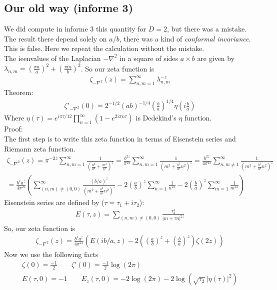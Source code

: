 \documentclass[12pt]{article}
\begin{document}
\subsection{Our old way (informe 3)}
We did compute in informe 3 this quantity for $D=2$, but there was a mistake. The result there depend solely on $a/b$, there was a kind of \textit{conformal invariance}. This is false. Here we repeat the calculation without the mistake.\\
The ieenvalues of the Laplacian $-\nabla^2$ in a square of sides $a\times b$ are given by $\lambda_{n,m}=\left(\frac{\pi n}{a}\right)^2+\left(\frac{\pi m}{b}\right)^2$. So our zeta function is
\begin{gather}
\zeta_{-\nabla^2}(z)=\sum_{n,m=1}^\infty \lambda_{n,m}^{-z}
\end{gather}
Theorem:
\begin{gather*}
\zeta'_{-\nabla^2}(0)=2^{-1/2}(ab)^{-1/4}\left(\frac{b}{a}\right)^{1/4}\eta\left(i\frac{b}{a}\right)
\end{gather*}
Where $\eta(\tau)=e^{i\pi\tau/12}\prod_{n=1}^{\infty}(1-e^{2i\pi n\tau})$ is Dedekind's $\eta$ function.\\
Proof:\\
The first step is to write this zeta function in terms of Eisenstein series and Riemann zeta function.
\begin{gather}
\zeta_{-\nabla^2}(z)=\pi^{-2z}\sum_{n,m=1}^\infty \frac{1}{\left(\frac{n^2}{a^2}+\frac{m^2}{b^2}\right)^z}=\frac{b^{2z}}{\pi^{2z}}\sum_{n,m=1}^\infty\frac{1}{\left(m^2+\frac{b^2}{a^2}n^2\right)^z}=\frac{b^{2z}}{4\pi^{2z}}\sum_{n,m\neq 1}^\infty\frac{1}{\left(m^2+\frac{b^2}{a^2}n^2\right)^z} \nonumber\\
=\frac{b^{z}a^z}{4\pi^{2z}}\left(\sum_{(n,m)\neq (0,0)}^\infty\frac{(b/a)^z}{\left(m^2+\frac{b^2}{a^2}n^2\right)^z}-2\left(\frac{a}{b}\right)^z\sum_{n=1}^{\infty}\frac{1}{n^{2z}}-2\left(\frac{b}{a}\right)^z\sum_{m=1}^{\infty}\frac{1}{m^{2z}}\right)
\end{gather}
Eisenstein series are defined by ($\tau=\tau_1+i\tau_2$):
\begin{gather}
E(\tau,z)=\sum_{(n,m)\neq (0,0)}\frac{\tau_2^z}{|m+\tau n|^{2z}}
\end{gather}
So, our zeta function is
\begin{gather}
\zeta_{-\nabla^2}(z)=\frac{b^{z}a^z}{4\pi^{2z}}\left(E(ib/a,z)-2\left(\left(\frac{a}{b}\right)^z+\left(\frac{b}{a}\right)^z\right)\zeta(2z)\right)
\end{gather}
Now we use the following facts
\begin{gather}
\zeta(0)=\frac{-1}{2}\qquad \zeta'(0)=\frac{-1}{2}\log(2\pi) \\
E(\tau,0)=-1\qquad E_z(\tau,0)=-2\log(2\pi)-2\log(\sqrt{\tau_2}|\eta(\tau)|^2)
\end{gather}
\end{document}
